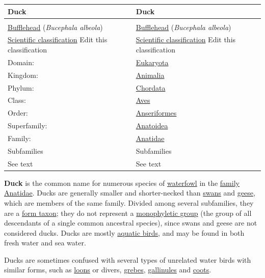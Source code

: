 \documentclass[11pt,a4paper]{article}
\begin{document}
\begin{table}[h]
\begin{tabular}{|l|l|}
\hline
Duck & Duck \\ \hline
 & %
 \\ \hline
\href{/wiki/Bufflehead}{Bufflehead} (\textit{Bucephala albeola}) & \href{/wiki/Bufflehead}{Bufflehead} (\textit{Bucephala albeola}) \\ \hline
\href{/wiki/Taxonomy\_\%28biology\%29}{Scientific classification}  %
Edit this classification & \href{/wiki/Taxonomy\_\%28biology\%29}{Scientific classification}  %
Edit this classification \\ \hline
Domain: & \href{/wiki/Eukaryote}{Eukaryota} \\ \hline
Kingdom: & \href{/wiki/Animal}{Animalia} \\ \hline
Phylum: & \href{/wiki/Chordate}{Chordata} \\ \hline
Class: & \href{/wiki/Bird}{Aves} \\ \hline
Order: & \href{/wiki/Anseriformes}{Anseriformes} \\ \hline
Superfamily: & \href{/wiki/Anatoidea}{Anatoidea} \\ \hline
Family: & \href{/wiki/Anatidae}{Anatidae} \\ \hline
Subfamilies & Subfamilies \\ \hline
See text & See text \\ \hline
\end{tabular}
\end{table}

\textbf{Duck} is the common name for numerous species of \href{/wiki/Waterfowl}{waterfowl} in the \href{/wiki/Family\_\%28biology\%29}{family} \href{/wiki/Anatidae}{Anatidae}. Ducks are generally smaller and shorter-necked than \href{/wiki/Swan}{swans} and \href{/wiki/Goose}{geese}, which are members of the same family. Divided among several subfamilies, they are a \href{/wiki/Form\_taxon}{form taxon}; they do not represent a \href{/wiki/Monophyletic\_group}{monophyletic group} (the group of all descendants of a single common ancestral species), since swans and geese are not considered ducks. Ducks are mostly \href{/wiki/Aquatic\_bird}{aquatic birds}, and may be found in both fresh water and sea water.

Ducks are sometimes confused with several types of unrelated water birds with similar forms, such as \href{/wiki/Loon}{loons} or divers, \href{/wiki/Grebe}{grebes}, \href{/wiki/Gallinule}{gallinules} and \href{/wiki/Coot}{coots}.
\end{document}
